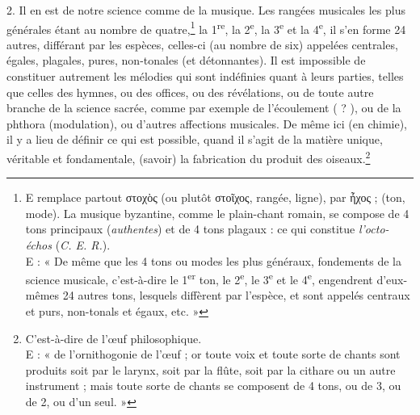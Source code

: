 \documentclass[a4paper, 11pt, oneside, polutonikogreek, french]{article}
\begin{document}
2. Il en est de notre science comme de la musique. Les rangées musicales les plus générales étant au nombre de quatre,\footnote{E remplace partout στοχὸς (ou plutôt στοῖχος, rangée, ligne), par ἦχος ; (ton, mode). La musique byzantine, comme le plain-chant romain, se compose de 4 tons principaux (\emph{authentes}) et de 4 tons plagaux : ce qui constitue \emph{l'octo-échos} (\emph{C. E. R.}).\\\hspace*{5mm}E : « De même que les 4 tons ou modes les plus généraux, fondements de la science musicale, c'est-à-dire le 1\textsuperscript{er} ton, le 2\textsuperscript{e}, le 3\textsuperscript{e} et le 4\textsuperscript{e}, engendrent d'eux-mêmes 24 autres tons, lesquels diffèrent par l'espèce, et sont appelés centraux et purs, non-tonals et égaux, etc. »} la 1\textsuperscript{re}, la 2\textsuperscript{e}, la 3\textsuperscript{e} et la 4\textsuperscript{e}, il s'en forme 24 autres, différant par les espèces, celles-ci (au nombre de six) appelées centrales, égales, plagales, pures, non-tonales (et détonnantes). Il est impossible de constituer autrement les mélodies qui sont indéfinies quant à leurs parties, telles que celles des hymnes, ou des offices, ou des révélations, ou de toute autre branche de la science sacrée, comme par exemple de l'écoulement ( ? ), ou de la phthora (modulation), ou d'autres affections musicales. De même ici (en chimie), il y a lieu de définir ce qui est possible, quand il s'agit de la matière unique, véritable et fondamentale, (savoir) la fabrication du produit des oiseaux.\footnote{C'est-à-dire de l'œuf philosophique.\\\hspace*{5mm}E : « de l'ornithogonie de l'œuf ; or toute voix et toute sorte de chants sont produits soit par le larynx, soit par la flûte, soit par la cithare ou un autre instrument ; mais toute sorte de chants se composent de 4 tons, ou de 3, ou de 2, ou d'un seul. »}
\end{document}
